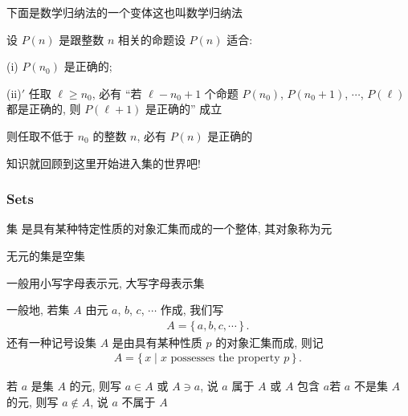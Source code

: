 下面是数学归纳法的一个变体\period 这也叫数学归纳法\period

\begin{proposition}
    设 $P(n)$ 是跟整数 $n$ 相关的命题\period 设 $P(n)$ 适合:

    (i) $P(n_0)$ 是正确的;

    (ii)$\prime$ 任取 $\ell \geq n_0$, 必有 ``若 $\ell - n_0 + 1$ 个命题 $P(n_0)$, $P(n_0 + 1)$, $\cdots$, $P(\ell)$ 都是正确的, 则 $P(\ell + 1)$ 是正确的'' 成立\period

    则任取不低于 $n_0$ 的整数 $n$, 必有 $P(n)$ 是正确的\period
\end{proposition}

知识就回顾到这里\period 开始进入集的世界吧!

\subsubsection*{Sets}

\begin{definition}
    集  是具有某种特定性质的对象汇集而成的一个整体, 其对象称为元 \period
\end{definition}

\begin{definition}
    无元的集是空集 \period
\end{definition}

\begin{remark}
    一般用小写字母表示元, 大写字母表示集\period
\end{remark}

\begin{definition}
    一般地, 若集 $A$ 由元 $a$, $b$, $c$, $\cdots$ 作成, 我们写
    \begin{align*}
        A = \{\, a,b,c,\cdots \,\} \period
    \end{align*}
    还有一种记号\period 设集 $A$ 是由具有某种性质 $p$ 的对象汇集而成, 则记
    \begin{align*}
        A = \{\, x \mid x \text{ possesses the property } p \,\} \period
    \end{align*}
\end{definition}

\begin{definition}
    若 $a$ 是集 $A$ 的元, 则写 $a \in A$ 或 $A \ni a$, 说 $a$ 属于  $A$ 或 $A$ 包含  $a$\period 若 $a$ 不是集 $A$ 的元, 则写 $a \notin A$, 说 $a$ 不属于 $A$\period{}
\end{definition}

